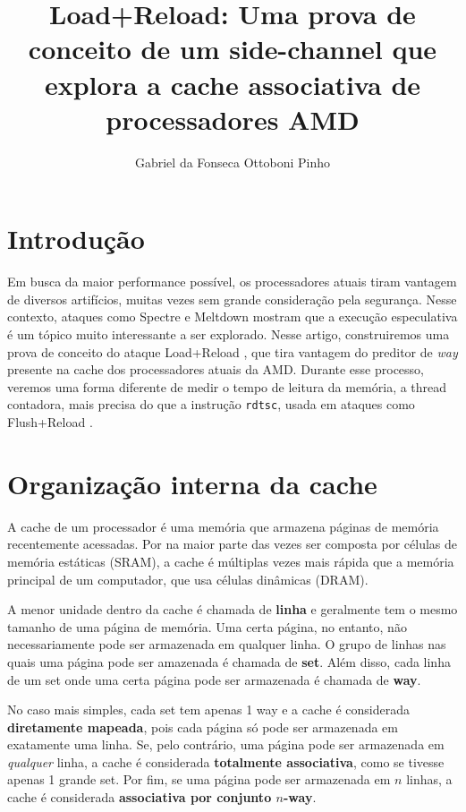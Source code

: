 \documentclass[twocolumn, 12pt]{article}
\author{Gabriel da Fonseca Ottoboni Pinho}
\title{Load+Reload: Uma prova de conceito de um side-channel que explora a cache associativa de processadores AMD}
\begin{document}
\maketitle

\section{Introdução}
Em busca da maior performance possível,
os processadores atuais
tiram vantagem de diversos artifícios,
muitas vezes sem grande consideração pela segurança.
Nesse contexto,
ataques como Spectre \cite{spectre} e Meltdown \cite{meltdown}
mostram que a execução especulativa
é um tópico muito interessante a ser explorado.
Nesse artigo, construiremos uma prova de conceito
do ataque Load+Reload \cite{takeaway},
que tira vantagem do preditor de \textit{way}
presente na cache dos
processadores atuais da AMD.
Durante esse processo,
veremos uma forma diferente
de medir o tempo de leitura
da memória, a thread contadora,
mais precisa do que a instrução \texttt{rdtsc},
usada em ataques como Flush+Reload \cite{flushreload}.

\section{Organização interna da cache}
A cache de um processador é
uma memória que armazena
páginas de memória recentemente acessadas.
Por na maior parte das vezes ser composta por
células de memória estáticas (SRAM),
a cache é múltiplas vezes mais rápida
que a memória principal de um computador,
que usa células dinâmicas (DRAM).

A menor unidade dentro da cache é
chamada de \textbf{linha} e geralmente
tem o mesmo tamanho de uma página de memória.
Uma certa página, no entanto,
não necessariamente pode ser
armazenada em qualquer linha.
O grupo de linhas nas quais
uma página pode ser amazenada
é chamada de \textbf{set}.
Além disso, cada linha de um set
onde uma certa página pode ser armazenada
é chamada de \textbf{way}.

No caso mais simples,
cada set tem apenas 1 way e
a cache é considerada \textbf{diretamente mapeada},
pois cada página só pode ser armazenada
em exatamente uma linha.
Se, pelo contrário, uma página
pode ser armazenada em \textit{qualquer} linha,
a cache é considerada \textbf{totalmente associativa},
como se tivesse apenas 1 grande set.
Por fim, se uma página pode ser armazenada em $n$ linhas,
a cache é considerada \textbf{associativa por conjunto $n$-way}.
\end{document}
